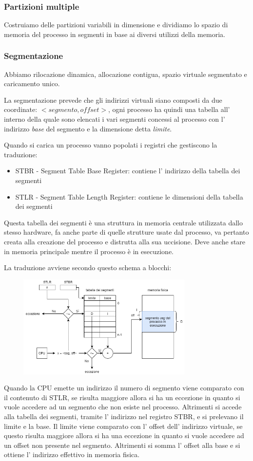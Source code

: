 \subsubsection{Partizioni multiple}
Costruiamo delle partizioni variabili in dimensione e dividiamo lo spazio di memoria del processo in segmenti in base ai diversi utilizzi della memoria.

\subsubsection{Segmentazione}
Abbiamo rilocazione dinamica, allocazione contigua, spazio virtuale segmentato e caricamento unico.

La segmentazione prevede che gli indirizzi virtuali siano composti da due coordinate: $<segmento, offset>$, ogni processo ha quindi una tabella all' interno della quale sono elencati i vari segmenti concessi al processo con l' indirizzo \emph{base} del segmento e la dimensione detta \emph{limite}.

Quando si carica un processo vanno popolati i registri che gestiscono la traduzione:
\begin{itemize}
    \item STBR - Segment Table Base Register: contiene l' indirizzo della tabella dei segmenti
    \item STLR - Segment Table Length Register: contiene le dimensioni della tabella dei segmenti
\end{itemize}
Questa tabella dei segmenti è una struttura in memoria centrale utilizzata dallo stesso hardware, fa anche parte di quelle strutture usate dal processo, va pertanto creata alla creazione del processo e distrutta alla sua uccisione.
Deve anche stare in memoria principale mentre il processo è in esecuzione.

La traduzione avviene secondo questo schema a blocchi:
\begin{figure}[H]
    \centering
    \includegraphics[width=330px]{images/9_Gestione_della_memoria/segmented_memory_mmu.png}
\end{figure}
Quando la CPU emette un indirizzo il numero di segmento viene comparato con il contenuto di STLR, se risulta maggiore allora si ha un eccezione in quanto si vuole accedere ad un segmento che non esiste nel processo.
Altrimenti si accede alla tabella dei segmenti, tramite l' indirizzo nel registro STBR, e si prelevano il limite e la base.
Il limite viene comparato con l' offset dell' indirizzo virtuale, se questo risulta maggiore allora si ha una eccezione in quanto si vuole accedere ad un offset non presente nel segmento.
Altrimenti si somma l' offset alla base e si ottiene l' indirizzo effettivo in memoria fisica.



